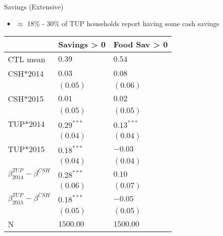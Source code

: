 \documentclass[t,presentation]{beamer}
\begin{document}
\begin{frame}[label={sec:orgheadline16}]{Savings (Extensive)}
\begin{itemize}
\item \(\approx\) 18\% - 30\% of TUP households report having some cash savings
\end{itemize}

\begin{center}
\begin{tabular}{lll}
\hline
 & Savings > 0 & Food Sav > 0\\
\hline
CTL mean & \(0.39\) & \(0.54\)\\
\hline
CSH*2014 & \(0.03\) & \(0.08\)\\
 & \(( 0.05)\) & \(( 0.06)\)\\
CSH*2015 & \(0.01\) & \(0.02\)\\
 & \(( 0.05)\) & \(( 0.05)\)\\
TUP*2014 & \(0.29^{***}\) & \(0.13^{***}\)\\
 & \(( 0.04)\) & \(( 0.04)\)\\
TUP*2015 & \(0.18^{***}\) & \(-0.03\)\\
 & \(( 0.04)\) & \(( 0.04)\)\\
\hline
\(\beta^{TUP}_{2014}-\beta^{CSH}\) & \(0.28^{***}\) & \(0.10\)\\
 & \(( 0.06)\) & \(( 0.07)\)\\
\(\beta^{TUP}_{2015}-\beta^{CSH}\) & \(0.18^{***}\) & \(-0.05\)\\
 & \(( 0.05)\) & \(( 0.05)\)\\
N & \(1500.00\) & \(1500.00\)\\
\hline
\end{tabular}
\end{center}
\end{frame}
\end{document}
